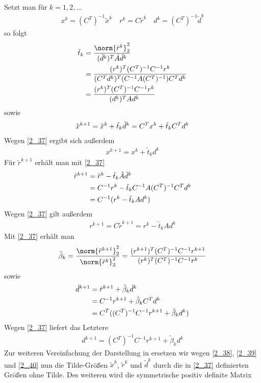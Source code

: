 Setzt man für $k=1,2,...$
\begin{align}
	\label{2_37}
	x^k=(C^T)^{-1}\tilde{x}^k\quad r^k=C\tilde{r}^k\quad d^k=(C^T)^{-1}\tilde{d}^k
\end{align}
so folgt
\begin{align}
	\tilde{t}_k &= \frac{\norm{\tilde{r}^k}_2^2}{(\tilde{d}^k)^T\tilde{A}\tilde{d}^k} \notag \\
	&= \frac{(r^k)^T(C^T)^{-1}C^{-1}r^k}{(C^Td^k)^T(C^{-1}A(C^T)^{-1})C^Td^k} \notag \\
	&= \frac{(r^k)^T(C^T)^{-1}C^{-1}r^k}{(d^k)^TAd^k} \notag
\end{align}
sowie
\begin{align}
	\tilde{x}^{k+1} = \tilde{x}^k + \tilde{t}_k\tilde{d}^k = C^Tx^k+\tilde{t}_kC^Td^k\notag
\end{align}
Wegen \cref{2_37} ergibt sich außerdem
\begin{align}
	\label{2_38}
	x^{k+1} = x^k+\tilde{t}_kd^k
\end{align}
Für $\tilde{r}^{k+1}$ erhält man mit \cref{2_37}
\begin{align}
	\tilde{r}^{k+1} &= \tilde{r}^k - \tilde{t}_k\tilde{A}\tilde{d}^k \notag \\
	&= C^{-1}r^k-\tilde{t}_kC^{-1}A(C^T)^{-1}C^Td^k \notag \\
	&= C^{-1}(r^k-\tilde{t}_kAd^k) \notag
\end{align}
Wegen \cref{2_37} gilt außerdem
\begin{align}
	\label{2_39}
	r^{k+1} = C\tilde{r}^{k+1} = r^k-\tilde{t}_kAd^k
\end{align}
Mit \cref{2_37} erhält man
\begin{align}
	\tilde{\beta}_k = \frac{\norm{\tilde{r}^{k+1}}_2^2}{\norm{\tilde{r}^k}_2^2} = \frac{(r^{k+1})^T(C^T)^{-1}C^{-1}r^{k+1}} {(r^k)^T(C^T)^{-1}C^{-1}r^k} \notag
\end{align}
sowie
\begin{align}
	\tilde{d}^{k+1} &= \tilde{r}^{k+1}+\tilde{\beta}_k\tilde{d}^k \notag \\
	&= C^{-1}r^{k+1} + \tilde{\beta}_kC^Td^k \notag \\
	&= C^T((C^T)^{-1}C^{-1}r^{k+1}+\tilde{\beta}_kd^k) \notag
\end{align}
Wegen \cref{2_37} liefert das Letztere
\begin{align}
	\label{2_40}
	d^{k+1} = (C^T)^{-1}C^{-1}r^{k+1}+\tilde{\beta}_kd^k
\end{align}
Zur weiteren Vereinfachung der Darstellung in  ersetzen wir wegen \cref{2_38}, \cref{2_39} und \cref{2_40} nun die Tilde-Größen $\tilde{x}^k$, $\tilde{r}^k$ und $\tilde{d}^k$ durch die in \cref{2_37} definierten Größen ohne Tilde. Des weiteren wird die symmetrische positiv definite Matrix
